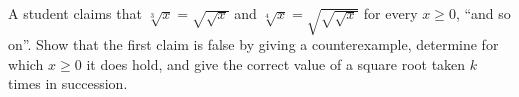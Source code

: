 A student claims that $\sqrt[3]{x}=\sqrt{\sqrt{x}}$ and $\sqrt[4]{x}=\sqrt{\sqrt{\sqrt{x}}}$ for every $x\ge0$, ``and so on''. Show that the first claim is false by giving a counterexample, determine for which $x\ge0$ it does hold, and give the correct value of a square root taken $k$ times in succession.
